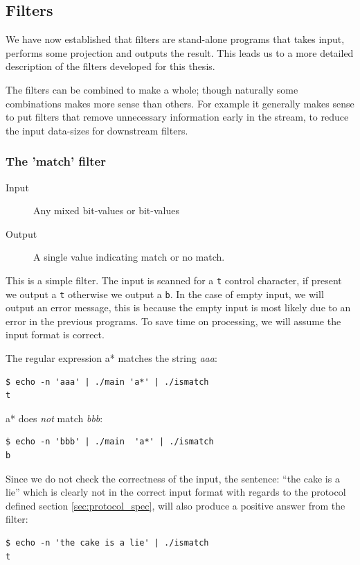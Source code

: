 \subsection{Filters}
We have now established that filters are stand-alone programs that
takes input, performs some projection and outputs the result. 
This leads us to a more detailed description of the filters
developed for this thesis. 

The filters can be combined to make a whole; though naturally some
combinations makes more sense than others. For example it generally
makes sense to put filters that remove unnecessary information early
in the stream, to reduce the input data-sizes for downstream filters.




\subsubsection{The 'match' filter}

\begin{description}
    \item[Input] Any mixed bit-values or bit-values
    \item[Output] A single value indicating match or no match.
\end{description}

This is a simple filter. The input is scanned for a \texttt{t} control
character, if present we output a \texttt{t} otherwise we output a
\texttt{b}. In the case of empty input, we will output an error
message, this is because the empty input is most likely due to an
error in the previous programs. To save time on processing, we will
assume the input format is correct.

\begin{example}
The regular expression \textsf{a*} matches the string \textsl{aaa}:
\begin{verbatim}
$ echo -n 'aaa' | ./main 'a*' | ./ismatch 
t
\end{verbatim}
\textsf{a*} does \emph{not} match \textsl{bbb}:
\begin{verbatim}
$ echo -n 'bbb' | ./main  'a*' | ./ismatch 
b
\end{verbatim}
Since we do not check the correctness of the input, the sentence:
``the cake is a lie'' which is clearly not in the correct input format
with regards to the protocol defined section \vref{sec:protocol_spec},
will also produce a positive answer from the filter:
\begin{verbatim}
$ echo -n 'the cake is a lie' | ./ismatch
t
\end{verbatim}

\end{example}

